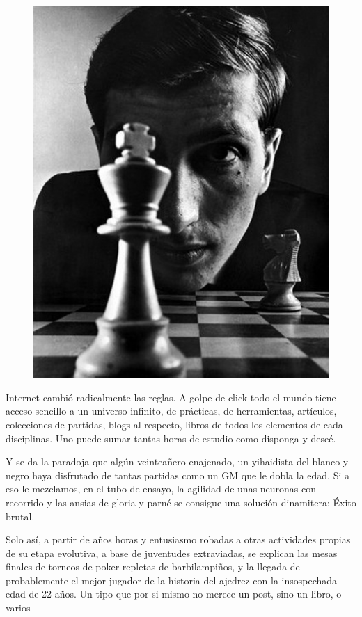 \begin{figure} 
 \begin{figurebox}
       \centering
   \includegraphics[scale=0.45]{ajedrez.jpg}
  \end{figurebox}
\vspace{-0.5cm}
\end{figure}

Internet cambió radicalmente las reglas. A golpe de click todo el mundo tiene acceso sencillo a un universo infinito, de prácticas, de herramientas, artículos, colecciones de partidas, blogs al respecto, libros de todos los elementos de cada disciplinas. Uno puede sumar tantas horas de estudio como disponga y deseé. 

Y se da la paradoja que algún veinteañero enajenado, un yihaidista del blanco y negro haya disfrutado de tantas partidas como un GM que le dobla la edad. Si a eso le mezclamos, en el tubo de ensayo, la agilidad de unas neuronas con recorrido  y las ansias de gloria y parné se consigue una solución dinamitera: Éxito brutal.

Solo así, a partir de años horas y entusiasmo robadas a otras actividades propias de su etapa evolutiva, a base de juventudes extraviadas, se explican las mesas finales de torneos de poker repletas de barbilampiños, y la llegada de probablemente el mejor jugador de la historia del ajedrez con la insospechada edad de 22 años. Un tipo que por si mismo no merece un post, sino un libro, o varios

